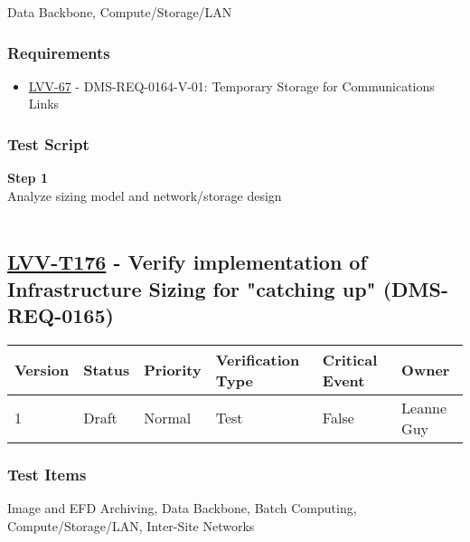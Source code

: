 Data Backbone, Compute/Storage/LAN~

\hypertarget{requirements-152}{%
\subsubsection{Requirements}\label{requirements-152}}

\begin{itemize}
\tightlist
\item
  \href{https://jira.lsstcorp.org/browse/LVV-67}{LVV-67} -
  DMS-REQ-0164-V-01: Temporary Storage for Communications Links
\end{itemize}

\hypertarget{test-script-152}{%
\subsubsection{Test Script}\label{test-script-152}}

\textbf{Step 1}\\
Analyze sizing model and network/storage design\\
~\\

\hypertarget{lvv-t176---verify-implementation-of-infrastructure-sizing-for-catching-up-dms-req-0165}{%
\subsection{\texorpdfstring{\href{https://jira.lsstcorp.org/secure/Tests.jspa\#/testCase/LVV-T176}{LVV-T176}
- Verify implementation of Infrastructure Sizing for "catching up"
(DMS-REQ-0165)}{LVV-T176 - Verify implementation of Infrastructure Sizing for "catching up" (DMS-REQ-0165)}}\label{lvv-t176---verify-implementation-of-infrastructure-sizing-for-catching-up-dms-req-0165}}

\begin{longtable}[]{@{}llllll@{}}
\toprule
Version & Status & Priority & Verification Type & Critical Event &
Owner\tabularnewline
\midrule
\endhead
1 & Draft & Normal & Test & False & Leanne Guy\tabularnewline
\bottomrule
\end{longtable}

\hypertarget{test-items-152}{%
\subsubsection{Test Items}\label{test-items-152}}

Image and EFD Archiving, Data Backbone, Batch Computing,
Compute/Storage/LAN, Inter-Site Networks

